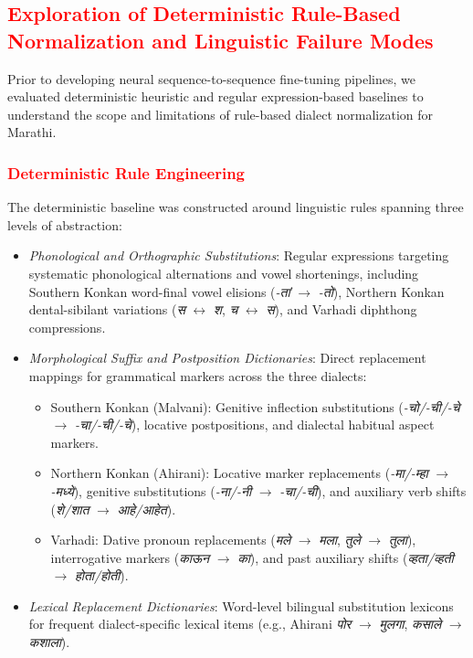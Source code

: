 \documentclass[11pt, a4paper]{article}
\begin{document}
\subsection{\textcolor{red}{Exploration of Deterministic Rule-Based Normalization and Linguistic Failure Modes}}
\label{subsec:rule_baseline_intro}

\color{red}
Prior to developing neural sequence-to-sequence fine-tuning pipelines, we evaluated deterministic heuristic and regular expression-based baselines to understand the scope and limitations of rule-based dialect normalization for Marathi.

\subsubsection{\textcolor{red}{Deterministic Rule Engineering}}
The deterministic baseline was constructed around linguistic rules spanning three levels of abstraction:
\begin{itemize}
    \item \emph{Phonological and Orthographic Substitutions}: Regular expressions targeting systematic phonological alternations and vowel shortenings, including Southern Konkan word-final vowel elisions (\emph{-तां} $\rightarrow$ \emph{-तो}), Northern Konkan dental-sibilant variations (\emph{स} $\leftrightarrow$ \emph{श}, \emph{च} $\leftrightarrow$ \emph{स}), and Varhadi diphthong compressions.
    \item \emph{Morphological Suffix and Postposition Dictionaries}: Direct replacement mappings for grammatical markers across the three dialects:
    \begin{itemize}
        \item Southern Konkan (Malvani): Genitive inflection substitutions (\emph{-चो/-ची/-चे} $\rightarrow$ \emph{-चा/-ची/-चे}), locative postpositions, and dialectal habitual aspect markers.
        \item Northern Konkan (Ahirani): Locative marker replacements (\emph{-मा/-म्हा} $\rightarrow$ \emph{-मध्ये}), genitive substitutions (\emph{-ना/-नी} $\rightarrow$ \emph{-चा/-ची}), and auxiliary verb shifts (\emph{शे/शात} $\rightarrow$ \emph{आहे/आहेत}).
        \item Varhadi: Dative pronoun replacements (\emph{मले} $\rightarrow$ \emph{मला}, \emph{तुले} $\rightarrow$ \emph{तुला}), interrogative markers (\emph{काऊन} $\rightarrow$ \emph{का}), and past auxiliary shifts (\emph{व्हता/व्हती} $\rightarrow$ \emph{होता/होती}).
    \end{itemize}
    \item \emph{Lexical Replacement Dictionaries}: Word-level bilingual substitution lexicons for frequent dialect-specific lexical items (e.g., Ahirani \emph{पोर} $\rightarrow$ \emph{मुलगा}, \emph{कसाले} $\rightarrow$ \emph{कशाला}).
\end{itemize}
\end{document}
